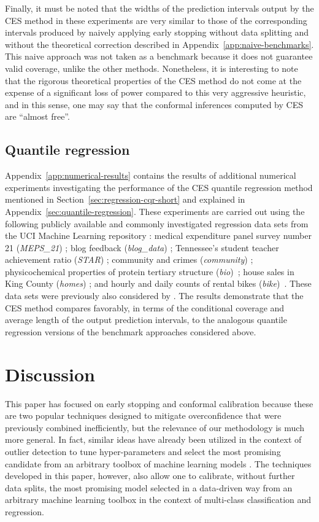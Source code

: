 Finally, it must be noted that the widths of the prediction intervals output by the CES method in these experiments are very similar to those of the corresponding intervals produced by naively applying early stopping without data splitting and without the theoretical correction described in Appendix~\ref{app:naive-benchmarks}.
This naive approach was not taken as a benchmark because it does not guarantee valid coverage, unlike the other methods. Nonetheless, it is interesting to note that the rigorous theoretical properties of the CES method do not come at the expense of a significant loss of power compared to this very aggressive heuristic, and in this sense, one may say that the conformal inferences computed by CES are ``almost free''.


\subsection{Quantile regression}

Appendix~\ref{app:numerical-results} contains the results of additional numerical experiments investigating the performance of the CES quantile regression method mentioned in Section~\ref{sec:regression-cqr-short} and explained in Appendix~\ref{sec:quantile-regression}.
These experiments are carried out using the following publicly available and commonly investigated regression data sets from the UCI Machine Learning repository \cite{Pinar2012}: medical expenditure panel survey number 21 ({\em MEPS\_21}) \cite{meps_21}; blog feedback ({\em blog\_data}) \cite{blog_data}; Tennessee’s student teacher achievement ratio ({\em STAR}) \cite{star}; community and crimes ({\em community}) \cite{community}; physicochemical properties of protein tertiary structure ({\em bio})~\cite{data-bio}; house sales in King County ({\em homes}) \cite{homes}; and hourly and daily counts of rental bikes ({\em bike})~\cite{data-bike}. These data sets were previously also considered by \citet{romano2019conformalized}.
The results demonstrate that the CES method compares favorably, in terms of the conditional coverage and average length of the output prediction intervals, to the analogous quantile regression versions of the benchmark approaches considered above.


\section{Discussion} \label{sec:discussion}

This paper has focused on early stopping and conformal calibration because these are two popular techniques designed to mitigate overconfidence that were previously combined  inefficiently, but the relevance of our methodology is much more general.
In fact, similar ideas have already been utilized in the context of outlier detection to tune hyper-parameters and select the most promising candidate from an arbitrary toolbox of machine learning models \cite{Liang_2022_integrative_p_val}.
The techniques developed in this paper, however, also allow one to calibrate, without further data splits, the most promising model selected in a data-driven way from an arbitrary machine learning toolbox in the context of multi-class classification and regression.

